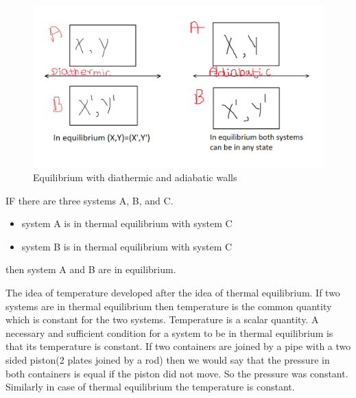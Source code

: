 \documentclass[12pt]{article}
\begin{document}
    \begin{figure}[h]
    	\includegraphics[scale=0.5]{zeroth_law.png}
    	\centering
    	\caption{Equilibrium with diathermic and adiabatic walls}
    \end{figure}
    \begin{tcolorbox}[title=Zeroth law]
    	IF there are three systems A, B, and C. 
    	\begin{itemize}
    		\item system A is in thermal equilibrium with system C
    		\item system B is in thermal equilibrium with system C
    	\end{itemize}
    then system A and B are in equilibrium.
    
    \end{tcolorbox}
   The idea of temperature developed after the idea of thermal equilibrium. If two systems are in thermal equilibrium then temperature is the common quantity which is constant for the two systems. Temperature is a scalar quantity. A necessary and sufficient condition for a system to be in thermal equilibrium is that its temperature is constant. If two containers are joined by a pipe with a two sided piston(2 plates joined by a rod) then we would say that the pressure in both containers is equal if the piston did not move. So the pressure was constant. Similarly in case of thermal equilibrium the temperature is constant. \\
   
\end{document}

